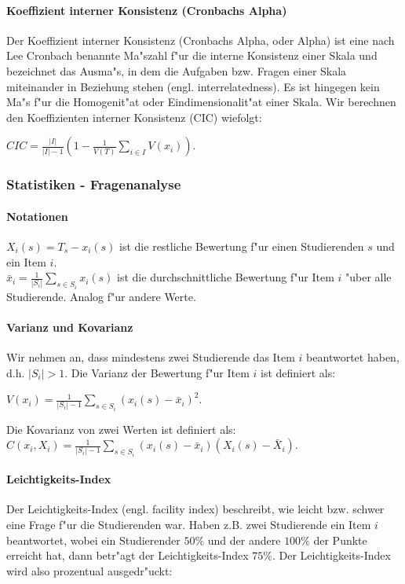 \documentclass[12pt]{report}
\begin{document}
\paragraph{Koeffizient interner Konsistenz (Cronbachs Alpha)}
Der Koeffizient interner Konsistenz (Cronbachs Alpha, oder Alpha) ist eine nach Lee Cronbach benannte Ma"szahl f"ur die interne Konsistenz einer Skala und bezeichnet das Ausma"s, in dem die Aufgaben bzw. Fragen einer Skala miteinander in Beziehung stehen (engl. interrelatedness). Es ist hingegen kein Ma"s f"ur die Homogenit"at oder Eindimensionalit"at einer Skala. Wir berechnen den Koeffizienten interner Konsistenz (CIC) wiefolgt:

$CIC=\frac{|I|}{|I|-1}\left(1-\frac{1}{V(T)}\sum\limits_{i\in I}V(x_i)\right)$.


\subsubsection{Statistiken - Fragenanalyse}
\paragraph{Notationen}

$X_i(s) = T_s - x_i(s)$ ist die restliche Bewertung f"ur einen Studierenden $s$ und ein Item $i$.\\
$\bar{x}_i = \frac{1}{|S_i|}\sum\limits_{s\in S_i}x_i(s)$ ist die durchschnittliche Bewertung f"ur Item $i$ "uber alle Studierende. Analog f"ur andere Werte.

\paragraph{Varianz und Kovarianz}

Wir nehmen an, dass mindestens zwei Studierende das Item $i$ beantwortet haben, d.h. $|S_i| > 1$.
Die Varianz der Bewertung f"ur Item $i$ ist definiert als:

 $V(x_i) = \frac{1}{|S_i| - 1}\sum\limits_{s\in S_i} (x_i(s) - \bar{x}_i)^2$.

\noindent Die Kovarianz von zwei Werten ist definiert als:\\
$C(x_i, X_i) = \frac{1}{|S_i| - 1}\sum\limits_{s\in S_i}(x_i(s) - \bar{x}_i)(X_i(s) - \bar{X}_i)$.


\paragraph{Leichtigkeits-Index}
Der Leichtigkeits-Index (engl. facility index) beschreibt, wie leicht bzw. schwer eine Frage f"ur die Studierenden war. 
Haben z.B. zwei Studierende ein Item $i$ beantwortet, wobei ein Studierender $50\%$ und der andere $100\%$ der Punkte erreicht hat, dann betr"agt der Leichtigkeits-Index $75\%$. Der Leichtigkeits-Index wird also prozentual ausgedr"uckt:
\end{document}
